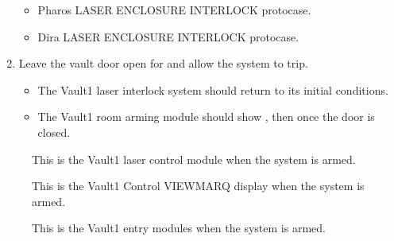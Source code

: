 \documentclass[letterpaper,10pt,english]{sphinxmanual}
\begin{document}
\begin{enumerate}
\begin{itemize}
\item {} 
\sphinxAtStartPar
Pharos LASER ENCLOSURE INTERLOCK protocase.

\item {} 
\sphinxAtStartPar
Dira LASER ENCLOSURE INTERLOCK protocase.

\end{itemize}

\item {} 
\sphinxAtStartPar
Leave the vault door open for  and allow the system to trip.
\begin{itemize}
\item {} 
\sphinxAtStartPar
The Vault\sphinxhyphen{}1 laser interlock system should return to its initial conditions.

\item {} 
\sphinxAtStartPar
The Vault\sphinxhyphen{}1 room arming module should show , then  once the door is closed.

\end{itemize}

\end{enumerate}

\begin{figure}[htbp]
\centering
\capstart

\noindent{}
\caption{ This is the Vault\sphinxhyphen{}1 laser control module when the system is armed.}\label{\detokenize{testing_documentation/Vault-1_laser:id7}}\end{figure}

\begin{figure}[htbp]
\centering
\capstart

\noindent{}
\caption{ This is the Vault\sphinxhyphen{}1 Control VIEWMARQ display when the system is armed.}\label{\detokenize{testing_documentation/Vault-1_laser:id8}}\end{figure}

\begin{figure}[htbp]
\centering
\capstart

\noindent{}
\caption{ This is the Vault\sphinxhyphen{}1 entry modules when the system is armed.}\label{\detokenize{testing_documentation/Vault-1_laser:id9}}\end{figure}
\end{document}
